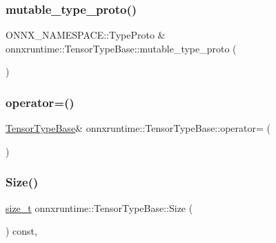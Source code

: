 \subsubsection{\texorpdfstring{mutable\+\_\+type\+\_\+proto()}{mutable\_type\_proto()}}
{\footnotesize\ttfamily O\+N\+N\+X\+\_\+\+N\+A\+M\+E\+S\+P\+A\+C\+E\+::\+Type\+Proto \& onnxruntime\+::\+Tensor\+Type\+Base\+::mutable\+\_\+type\+\_\+proto (\begin{DoxyParamCaption}{ }\end{DoxyParamCaption})\hspace{0.3cm}{\ttfamily [protected]}}

\mbox{\label{classonnxruntime_1_1TensorTypeBase_a7e92e65796abb3a8cb4722b2abac475a}} 
\subsubsection{\texorpdfstring{operator=()}{operator=()}}
{\footnotesize\ttfamily \mbox{\hyperlink{classonnxruntime_1_1TensorTypeBase}{Tensor\+Type\+Base}}\& onnxruntime\+::\+Tensor\+Type\+Base\+::operator= (\begin{DoxyParamCaption}\item[{const \mbox{\hyperlink{classonnxruntime_1_1TensorTypeBase}{Tensor\+Type\+Base}} \&}]{ }\end{DoxyParamCaption})\hspace{0.3cm}{\ttfamily [delete]}}

\mbox{\label{classonnxruntime_1_1TensorTypeBase_a1455fddb91004f40b6d060af404779e0}} 
\subsubsection{\texorpdfstring{Size()}{Size()}}
{\footnotesize\ttfamily \mbox{\hyperlink{mlasi_8h_a503efbc1c6e50825320ad909366b78ab}{size\+\_\+t}} onnxruntime\+::\+Tensor\+Type\+Base\+::\+Size (\begin{DoxyParamCaption}{ }\end{DoxyParamCaption}) const\hspace{0.3cm}{\ttfamily [override]}, {\ttfamily [virtual]}}



